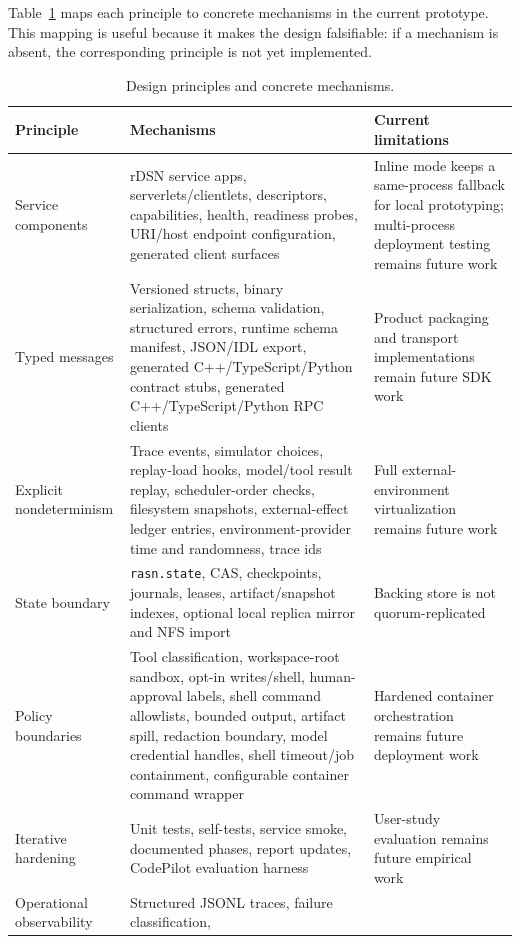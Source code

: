 \documentclass[manuscript,screen,review]{acmart}
\newcommand{\rdsn}{rDSN\xspace}
\newcommand{\codepilot}{CodePilot\xspace}
\begin{document}
Table~\ref{tab:principle-mechanism} maps each principle to concrete mechanisms
in the current prototype. This mapping is useful because it makes the design
falsifiable: if a mechanism is absent, the corresponding principle is not yet
implemented.

\begin{table}[t]
\caption{Design principles and concrete mechanisms.}
\label{tab:principle-mechanism}
\centering
\begin{tabular}{p{}p{}p{}}
\toprule
Principle & Mechanisms & Current limitations \\
\midrule
Service components & \rdsn service apps, serverlets/clientlets, descriptors,
capabilities, health, readiness probes, URI/host endpoint configuration,
generated client surfaces & Inline mode keeps a same-process fallback for local
prototyping; multi-process deployment testing remains future work \\
Typed messages & Versioned structs, binary serialization, schema validation,
structured errors, runtime schema manifest, JSON/IDL export, generated
C++/TypeScript/Python contract stubs, generated C++/TypeScript/Python RPC
clients & Product packaging and transport implementations remain future SDK
work \\
Explicit nondeterminism & Trace events, simulator choices, replay-load hooks,
model/tool result replay, scheduler-order checks, filesystem snapshots,
external-effect ledger entries, environment-provider time and randomness, trace
ids & Full external-environment virtualization remains future work \\
State boundary & \texttt{rasn.state}, CAS, checkpoints, journals, leases,
artifact/snapshot indexes, optional local replica mirror and NFS import &
Backing store is not quorum-replicated \\
Policy boundaries & Tool classification, workspace-root sandbox, opt-in
writes/shell, human-approval labels, shell command allowlists, bounded output,
artifact spill, redaction boundary, model credential handles, shell timeout/job
containment, configurable container command wrapper & Hardened container
orchestration remains future deployment work \\
Iterative hardening & Unit tests, self-tests, service smoke, documented phases,
report updates, \codepilot evaluation harness & User-study evaluation remains
future empirical work \\
Operational observability & Structured JSONL traces, failure classification,

\end{tabular}
\end{table}
\end{document}
